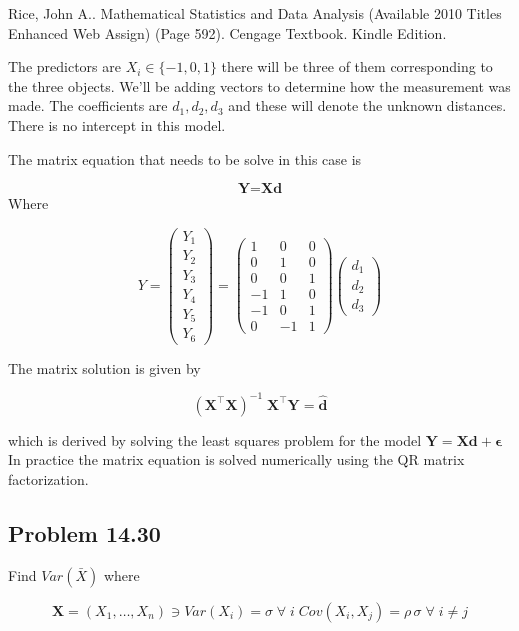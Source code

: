 \documentclass[12pt,]{article}
\begin{document}
Rice, John A.. Mathematical Statistics and Data Analysis (Available 2010
Titles Enhanced Web Assign) (Page 592). Cengage Textbook. Kindle
Edition.

The predictors are \(X_i \in \{-1,0,1\}\) there will be three of them
corresponding to the three objects. We'll be adding vectors to determine
how the measurement was made. The coefficients are \(d_1, d_2, d_3\) and
these will denote the unknown distances. There is no intercept in this
model.

The matrix equation that needs to be solve in this case is

\[ \textbf{Y} = \textbf{X} \textbf{d} \] Where

\[Y =\left(
\begin{array}{c}
Y_1\\
Y_2\\
Y_3\\
Y_4\\
Y_5\\
Y_6
\end{array}
\right) =
\left(
\begin{array}{ccc}
1 & 0 & 0\\
0 & 1 & 0\\
0 & 0 & 1\\
-1 & 1 & 0\\
-1 & 0 & 1\\
0 & -1 & 1
\end{array}
\right)
\left(
\begin{array}{c}
d_1 \\
d_2 \\
d_3
\end{array}
\right)
\]

The matrix solution is given by

\[(\textbf{X}^\intercal \textbf{X} )^{-1} \;  \textbf{X}^\intercal \textbf{Y}  = \hat{\textbf{d}}\]

which is derived by solving the least squares problem for the model
\(\textbf{Y} = \textbf{X} \textbf{d} + \boldsymbol\epsilon\) In practice
the matrix equation is solved numerically using the QR matrix
factorization.

\subsection{Problem 14.30}\label{problem-14.30}

Find \(Var(\bar{X})\) where

\[ \textbf{X} = (X_1, \ldots , X_n) \ni Var(X_i)=\sigma \; \forall \; i \; Cov(X_i,X_j)= \rho \, \sigma \; \forall \; i \neq j\]
\end{document}
